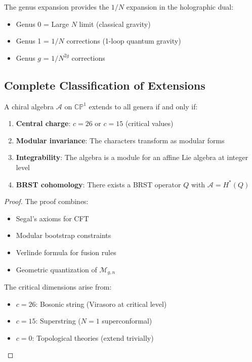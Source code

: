 The genus expansion provides the $1/N$ expansion in the holographic dual:
\begin{itemize}
\item Genus 0 = Large $N$ limit (classical gravity)
\item Genus 1 = $1/N$ corrections (1-loop quantum gravity)
\item Genus $g$ = $1/N^{2g}$ corrections
\end{itemize}

\subsection{Complete Classification of Extensions}

\begin{theorem}
A chiral algebra $\mathcal{A}$ on $\mathbb{CP}^1$ extends to all genera if and only if:
\begin{enumerate}
\item \textbf{Central charge}: $c = 26$ or $c = 15$ (critical values)
\item \textbf{Modular invariance}: The characters transform as modular forms
\item \textbf{Integrability}: The algebra is a module for an affine Lie algebra at integer level
\item \textbf{BRST cohomology}: There exists a BRST operator $Q$ with $\mathcal{A} = H^*(Q)$
\end{enumerate}
\end{theorem}

\begin{proof}
The proof combines:
\begin{itemize}
\item Segal's axioms for CFT
\item Modular bootstrap constraints
\item Verlinde formula for fusion rules
\item Geometric quantization of $\mathcal{M}_{g,n}$
\end{itemize}

The critical dimensions arise from:
\begin{itemize}
\item $c = 26$: Bosonic string (Virasoro at critical level)
\item $c = 15$: Superstring ($N=1$ superconformal)
\item $c = 0$: Topological theories (extend trivially)
\end{itemize}
\end{proof}

